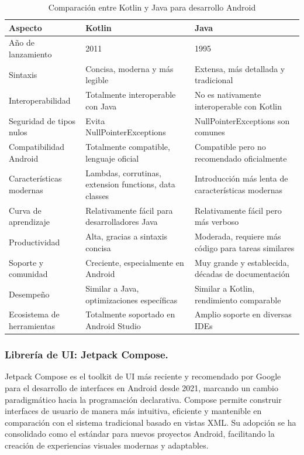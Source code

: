 \begin{table}[ht]
\centering
\caption{Comparación entre Kotlin y Java para desarrollo Android}
\label{tab:comparacion_kotlin_java}
\begin{tabular}{|p{}|p{}|p{}|}
\hline
\textbf{Aspecto}{\cellcolor[gray]{0.9}} & \textbf{Kotlin}{\cellcolor[gray]{0.9}} & \textbf{Java}{\cellcolor[gray]{0.9}} \\
\hline
Año de lanzamiento & 2011 & 1995 \\
\hline
Sintaxis & Concisa, moderna y más legible & Extensa, más detallada y tradicional \\
\hline
Interoperabilidad & Totalmente interoperable con Java & No es nativamente interoperable con Kotlin \\
\hline
Seguridad de tipos nulos & Evita NullPointerExceptions & NullPointerExceptions son comunes \\
\hline
Compatibilidad Android & Totalmente compatible, lenguaje oficial & Compatible pero no recomendado oficialmente \\
\hline
Características modernas & Lambdas, corrutinas, extension functions, data classes & Introducción más lenta de características modernas \\
\hline
Curva de aprendizaje & Relativamente fácil para desarrolladores Java & Relativamente fácil pero más verboso \\
\hline
Productividad & Alta, gracias a sintaxis concisa & Moderada, requiere más código para tareas similares \\
\hline
Soporte y comunidad & Creciente, especialmente en Android & Muy grande y establecida, décadas de documentación \\
\hline
Desempeño & Similar a Java, optimizaciones específicas & Similar a Kotlin, rendimiento comparable \\
\hline
Ecosistema de herramientas & Totalmente soportado en Android Studio & Amplio soporte en diversas IDEs \\
\hline
\end{tabular}
\end{table}

\subsubsection{Librería de UI: Jetpack Compose.}

Jetpack Compose es el toolkit de UI más reciente y recomendado por Google para el desarrollo de interfaces en Android desde 2021, marcando un cambio paradigmático hacia la programación declarativa. Compose permite construir interfaces de usuario de manera más intuitiva, eficiente y mantenible en comparación con el sistema tradicional basado en vistas XML. Su adopción se ha consolidado como el estándar para nuevos proyectos Android, facilitando la creación de experiencias visuales modernas y adaptables.

